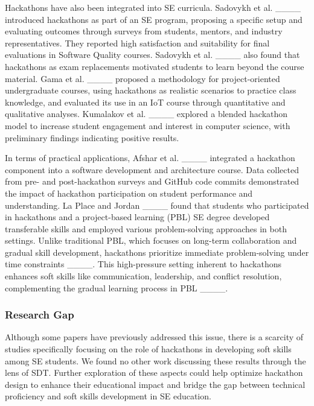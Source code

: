 Hackathons have also been integrated into SE curricula.  Sadovykh et al. ____ introduced hackathons as part of an SE program, proposing a specific setup and evaluating outcomes through surveys from students, mentors, and industry representatives. They reported high satisfaction and suitability for final evaluations in Software Quality courses. Sadovykh et al. ____ also found that hackathons as exam replacements motivated students to learn beyond the course material. Gama et al. ____ proposed a methodology for project-oriented undergraduate courses, using hackathons as realistic scenarios to practice class knowledge, and evaluated its use in an IoT course through quantitative and qualitative analyses. Kumalakov et al. ____ explored a blended hackathon model to increase student engagement and interest in computer science, with preliminary findings indicating positive results.

In terms of practical applications, Afshar et al. ____ integrated a hackathon component into a software development and architecture course. Data collected from pre- and post-hackathon surveys and GitHub code commits demonstrated the impact of hackathon participation on student performance and understanding. La Place and Jordan ____ found that students who participated in hackathons and a project-based learning (PBL) SE degree developed transferable skills and employed various problem-solving approaches in both settings. Unlike traditional PBL, which focuses on long-term collaboration and gradual skill development, hackathons prioritize immediate problem-solving under time constraints ____. This high-pressure setting inherent to hackathons enhances soft skills like communication, leadership, and conflict resolution, complementing the gradual learning process in PBL ____.

\subsubsection{Research Gap} Although some papers have previously addressed this issue, there is a scarcity of studies specifically focusing on the role of hackathons in developing soft skills among SE students. We found no other work discussing these results through the lens of SDT. Further exploration of these aspects could help optimize hackathon design to enhance their educational impact and bridge the gap between technical proficiency and soft skills development in SE education.



